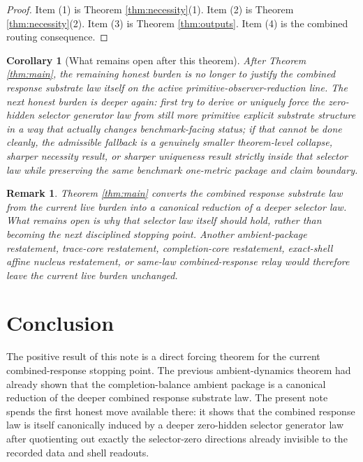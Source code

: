 \documentclass[11pt]{article}
\newtheorem{remark}{Remark}
\newtheorem{corollary}{Corollary}
\begin{document}
\begin{proof}
Item (1) is Theorem \ref{thm:necessity}(1). Item (2) is Theorem \ref{thm:necessity}(2). Item (3) is Theorem \ref{thm:outputs}. Item (4) is the combined routing consequence.
\end{proof}

\begin{corollary}[What remains open after this theorem]
\label{cor:next}
After Theorem \ref{thm:main}, the remaining honest burden is no longer to justify the combined response substrate law itself on the active primitive-observer-reduction line. The next honest burden is deeper again: first try to derive or uniquely force the zero-hidden selector generator law from still more primitive explicit substrate structure in a way that actually changes benchmark-facing status; if that cannot be done cleanly, the admissible fallback is a genuinely smaller theorem-level collapse, sharper necessity result, or sharper uniqueness result strictly inside that selector law while preserving the same benchmark one-metric package and claim boundary.
\end{corollary}

\begin{remark}
Theorem \ref{thm:main} converts the combined response substrate law from the current live burden into a canonical reduction of a deeper selector law. What remains open is why that selector law itself should hold, rather than becoming the next disciplined stopping point. Another ambient-package restatement, trace-core restatement, completion-core restatement, exact-shell affine nucleus restatement, or same-law combined-response relay would therefore leave the current live burden unchanged.
\end{remark}

\section{Conclusion}

The positive result of this note is a direct forcing theorem for the current combined-response stopping point. The previous ambient-dynamics theorem had already shown that the completion-balance ambient package is a canonical reduction of the deeper combined response substrate law. The present note spends the first honest move available there: it shows that the combined response law is itself canonically induced by a deeper zero-hidden selector generator law after quotienting out exactly the selector-zero directions already invisible to the recorded data and shell readouts.
\end{document}
